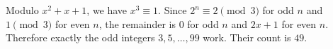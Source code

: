 Modulo $x^2+x+1$, we have $x^3\equiv1$. Since $2^n\equiv2\pmod3$ for odd $n$ and $1\pmod3$ for even $n$, the remainder is $0$ for odd $n$ and $2x+1$ for even $n$. Therefore exactly the odd integers $3,5,\ldots,99$ work. Their count is $\boxed{49}$.
